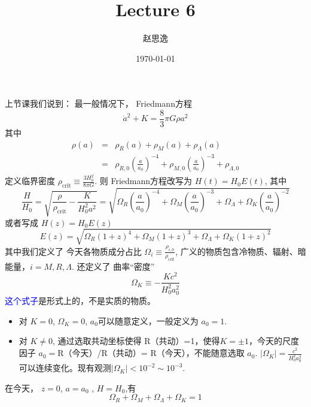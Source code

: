 \documentclass[12pt]{ctexart}
\title{Lecture 6}
\author{赵思逸}
\date{\today}
\newcommand{\new}[1]{\textcolor{blue}{#1}}
\begin{document}
\maketitle

上节课我们说到：
最一般情况下，
Friedmann方程
\begin{equation}
    \dot{a}^2+K = \frac{8}{3} \pi G \rho a^2
\end{equation}
其中 
\begin{eqnarray}
    \rho(a) &=& \rho_R(a) + \rho_M(a) + \rho_\Lambda (a) \label{eq:rho}
    \\ &=& \rho_{R,0}\left(\frac{a}{a_0}\right)^{-4} + \rho_{M,0}\left(\frac{a}{a_0}\right)^{-3}  + \rho_{\Lambda,0}     
\end{eqnarray}
定义临界密度 $\rho_\text{crit} \equiv \frac{3H_0^2}{8\pi G}$.
则
Friedmann方程改写为 $H(t)= H_0 E(t)$,   其中 
\begin{equation}
    \frac{H}{H_0} = \sqrt{\frac{\rho}{\rho_\text{crit}}-\frac{K}{H_0^2 a^2}} =\sqrt{\Omega_R\left(\frac{a}{a_0}\right)^{-4}+\Omega_M\left(\frac{a}{a_0}\right)^{-3}+\Omega_\Lambda+\Omega_K\left(\frac{a}{a_0}\right)^{-2}}
\end{equation}
或者写成
$H(z)=H_0 E(z)$
\begin{equation}
    E(z) = \sqrt{ \Omega_R \left(1+z\right)^{4} + \Omega_M \left(1+z\right)^{3} + \Omega_\Lambda + \Omega_K \left(1+z\right)^{2} }
\end{equation}
其中我们定义了
今天各物质成分占比 $\Omega_i\equiv\frac{\rho_{i,0}}{\rho_\text{crit}}$, 
广义的物质包含冷物质、辐射、暗能量，$i=M,R,\Lambda$.
还定义了
曲率“密度” 
\begin{equation}
    \Omega_K\equiv-\frac{Kc^2}{H_0^2a_0^2}
\end{equation}
\new{这个式子}是形式上的，不是实质的物质。
\begin{itemize}
    \item 对 $K=0$, $\Omega_K=0$, $a_0$可以随意定义，一般定义为 $a_0=1$.
    \item 对 $K\neq0$, 通过选取共动坐标使得 R（共动）=1，使得$K=\pm 1$，今天的尺度因子 $a_0=$R（今天）/R（共动）= R（今天），不能随意选取 $a_0$. $|\Omega_K|=\frac{c^2}{H_0^2a_0^2}$ 可以连续变化。现有观测$|\Omega_K|< 10^{-2}\sim 10^{-3}$.
\end{itemize} 

在今天， $z=0$, $a=a_0$ , $H=H_0$,有
\begin{equation}
    \Omega_R + \Omega_M + \Omega_\Lambda + \Omega_K = 1 \label{eq:allOmega}
\end{equation}
\end{document}
